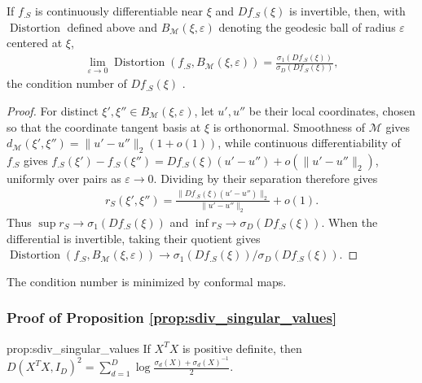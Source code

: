 \begin{proposition}
\label{prop:distortion_is_condition_number}
If $f_{.S}$ is continuously differentiable near $\xi$ and $Df_{.S}(\xi)$ is invertible, then, with $\operatorname{Distortion}$ defined above and $B_{\mathcal M}(\xi,\varepsilon)$ denoting the geodesic ball of radius $\varepsilon$ centered at $\xi$,
\begin{align}
\lim_{\varepsilon\to 0}
\operatorname{Distortion}\!\left(f_{.S},B_{\mathcal M}(\xi,\varepsilon)\right)
=\frac{\sigma_1\!\left(Df_{.S}(\xi)\right)}
       {\sigma_D\!\left(Df_{.S}(\xi)\right)},
\end{align}
the condition number of $Df_{.S}(\xi)$ \citep{GolubWilkinson-condition,Boyd2004-ql}.
\end{proposition}

\begin{proof}
For distinct $\xi',\xi''\in B_{\mathcal M}(\xi,\varepsilon)$, let $u',u''$ be their local coordinates, chosen so that the coordinate tangent basis at $\xi$ is orthonormal.
Smoothness of $\mathcal M$ gives $d_{\mathcal M}(\xi',\xi'')=\|u'-u''\|_2(1+o(1))$, while continuous differentiability of $f_{.S}$ gives $f_{.S}(\xi')-f_{.S}(\xi'')=Df_{.S}(\xi)(u'-u'')+o(\|u'-u''\|_2)$, uniformly over pairs as $\varepsilon\to0$.
Dividing by their separation therefore gives
\begin{align}
r_S(\xi',\xi'')
=\frac{\|Df_{.S}(\xi)(u'-u'')\|_2}{\|u'-u''\|_2}+o(1).
\end{align}
Thus $\sup r_S\to\sigma_1(Df_{.S}(\xi))$ and $\inf r_S\to\sigma_D(Df_{.S}(\xi))$.
When the differential is invertible, taking their quotient gives $\operatorname{Distortion}(f_{.S},B_{\mathcal M}(\xi,\varepsilon)) \to\sigma_1(Df_{.S}(\xi))/\sigma_D(Df_{.S}(\xi))$.
\end{proof}

\begin{proposition}
The condition number is minimized by conformal maps.
\end{proposition}


\subsubsection{Proof of Proposition \ref{prop:sdiv_singular_values}}
\label{proof:sdiv_singular_values}

\begin{restatedproposition}{prop:sdiv_singular_values}
If $X^T X$ is positive definite, then $D(X^T X,I_D)^2 = \sum_{d=1}^D \log \frac{\sigma_d(X) + \sigma_d(X)^{-1}}{2}$.
\end{restatedproposition}

